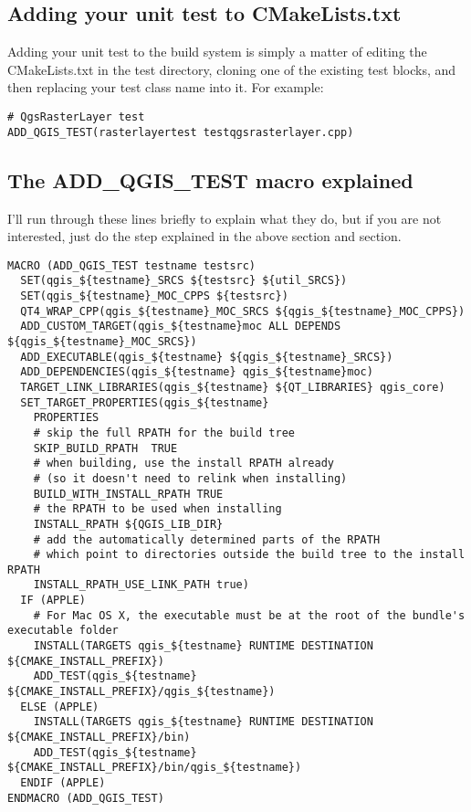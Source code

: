 \subsection{Adding your unit test to CMakeLists.txt}
Adding your unit test to the build system is simply a matter of editing the
CMakeLists.txt in the test directory, cloning one of the existing test blocks,
and then replacing your test class name into it.  For example:

\begin{verbatim}
# QgsRasterLayer test
ADD_QGIS_TEST(rasterlayertest testqgsrasterlayer.cpp)
\end{verbatim}

\subsection{The ADD\_QGIS\_TEST macro explained}
I'll run through these lines briefly to explain what they do, but if you are
not interested, just do the step explained in the above section and section.

\begin{verbatim}
MACRO (ADD_QGIS_TEST testname testsrc)
  SET(qgis_${testname}_SRCS ${testsrc} ${util_SRCS})
  SET(qgis_${testname}_MOC_CPPS ${testsrc})
  QT4_WRAP_CPP(qgis_${testname}_MOC_SRCS ${qgis_${testname}_MOC_CPPS})
  ADD_CUSTOM_TARGET(qgis_${testname}moc ALL DEPENDS ${qgis_${testname}_MOC_SRCS})
  ADD_EXECUTABLE(qgis_${testname} ${qgis_${testname}_SRCS})
  ADD_DEPENDENCIES(qgis_${testname} qgis_${testname}moc)
  TARGET_LINK_LIBRARIES(qgis_${testname} ${QT_LIBRARIES} qgis_core)
  SET_TARGET_PROPERTIES(qgis_${testname}
    PROPERTIES
    # skip the full RPATH for the build tree
    SKIP_BUILD_RPATH  TRUE
    # when building, use the install RPATH already
    # (so it doesn't need to relink when installing)
    BUILD_WITH_INSTALL_RPATH TRUE
    # the RPATH to be used when installing
    INSTALL_RPATH ${QGIS_LIB_DIR}
    # add the automatically determined parts of the RPATH
    # which point to directories outside the build tree to the install RPATH
    INSTALL_RPATH_USE_LINK_PATH true)
  IF (APPLE)
    # For Mac OS X, the executable must be at the root of the bundle's executable folder
    INSTALL(TARGETS qgis_${testname} RUNTIME DESTINATION ${CMAKE_INSTALL_PREFIX})
    ADD_TEST(qgis_${testname} ${CMAKE_INSTALL_PREFIX}/qgis_${testname})
  ELSE (APPLE)
    INSTALL(TARGETS qgis_${testname} RUNTIME DESTINATION ${CMAKE_INSTALL_PREFIX}/bin)
    ADD_TEST(qgis_${testname} ${CMAKE_INSTALL_PREFIX}/bin/qgis_${testname})
  ENDIF (APPLE)
ENDMACRO (ADD_QGIS_TEST)
\end{verbatim}

